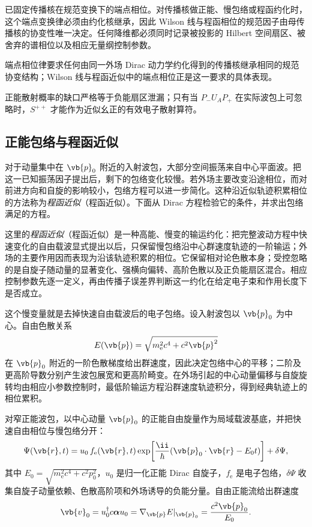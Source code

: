  已固定传播核在规范变换下的端点相位。对传播核做正能、慢包络或程函约化时，这个端点变换律必须由约化核继承，因此 Wilson 线与程函相位的规范因子由母传播核的协变性唯一决定。任何降维都必须同时记录被投影的 Hilbert 空间扇区、被舍弃的谱相位以及相应无量纲控制参数。

端点相位律要求任何由同一外场 Dirac 动力学约化得到的传播核继承相同的规范协变结构；Wilson 线与程函近似中的端点相位正是这一要求的具体表现。

正能散射概率的缺口严格等于负能扇区泄漏；只有当 $P_-U_AP_+$ 在实际波包上可忽略时，$S^{++}$ 才能作为近似幺正的有效电子散射算符。

\subsection{正能包络与程函近似}

对于动量集中在 $\vb{p}_0$ 附近的入射波包，大部分空间振荡来自中心平面波。把这一已知振荡因子提出后，剩下的包络变化较慢。若外场主要改变沿途相位，而对前进方向和自旋的影响较小，包络方程可以进一步简化。这种沿近似轨迹积累相位的方法称为\emph{程函近似}（程函近似）。下面从 Dirac 方程检验它的条件，并求出包络满足的方程。

这里的\emph{程函近似}（程函近似）是一种高能、慢变的输运约化：把完整波动方程中快速变化的自由载波显式提出以后，只保留慢包络沿中心群速度轨迹的一阶输运；外场的主要作用因而表现为沿该轨迹积累的相位。它保留相对论色散本身；受控忽略的是自旋子随动量的显著变化、强横向偏转、高阶色散以及正负能扇区混合。相应控制参数先逐一定义，再由传播子误差界判断这一约化在给定电子束和作用长度下是否成立。

这个慢变量就是去掉快速自由载波后的电子包络。设入射波包以 $\vb{p}_0$ 为中心。自由色散关系
\[
E(\vb{p})=\sqrt{m_{\mathrm e}^2c^4+c^2\vb{p}^2}
\]
在 $\vb{p}_0$ 附近的一阶色散梯度给出群速度，因此决定包络中心的平移；二阶及更高阶导数分别产生波包展宽和更高阶畸变。在外场引起的中心动量偏移与自旋旋转均由相应小参数控制时，最低阶输运方程沿群速度轨迹积分，得到经典轨迹上的相位累积。

对窄正能波包，以中心动量 $\vb{p}_0$ 的正能自由旋量作为局域载波基底，并把快速自由相位与慢包络分开：
\begin{equation*}
\Psi(\vb{r},t)
=u_0\,f_{\mathrm e}(\vb{r},t)
\exp\!\left[\frac{\ii}{\hbar}(\vb{p}_0\cdot\vb{r}-E_0t)\right]
+\delta\Psi,
\end{equation*}
其中 $E_0=\sqrt{m_{\mathrm e}^2c^4+c^2p_0^2}$，$u_0$ 是归一化正能 Dirac 自旋子，$f_{\mathrm e}$ 是电子包络，$\delta\Psi$ 收集自旋子动量依赖、色散高阶项和外场诱导的负能分量。自由正能流给出群速度
\begin{equation*}
\vb{v}_0=u_0^\dagger c\boldsymbol\alpha u_0
=\nabla_{\vb{p}}E|_{\vb{p}_0}
=\frac{c^2\vb{p}_0}{E_0}.
\end{equation*}

